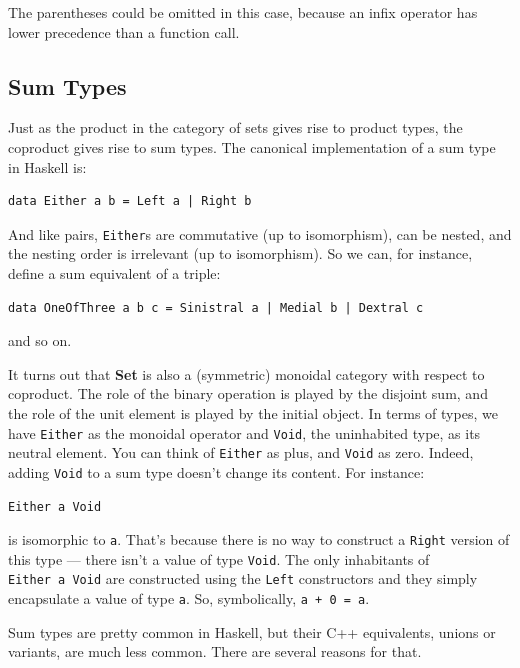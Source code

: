 The parentheses could be omitted in this case, because an infix operator
has lower precedence than a function call.

\subsection{Sum Types}\label{sum-types}

Just as the product in the category of sets gives rise to product types,
the coproduct gives rise to sum types. The canonical implementation of a
sum type in Haskell is:

\begin{verbatim}
data Either a b = Left a | Right b
\end{verbatim}

And like pairs, \texttt{Either}s are commutative (up to isomorphism),
can be nested, and the nesting order is irrelevant (up to isomorphism).
So we can, for instance, define a sum equivalent of a triple:

\begin{verbatim}
data OneOfThree a b c = Sinistral a | Medial b | Dextral c
\end{verbatim}

and so on.

It turns out that \textbf{Set} is also a (symmetric) monoidal category
with respect to coproduct. The role of the binary operation is played by
the disjoint sum, and the role of the unit element is played by the
initial object. In terms of types, we have \texttt{Either} as the
monoidal operator and \texttt{Void}, the uninhabited type, as its
neutral element. You can think of \texttt{Either} as plus, and
\texttt{Void} as zero. Indeed, adding \texttt{Void} to a sum type
doesn't change its content. For instance:

\begin{verbatim}
Either a Void
\end{verbatim}

is isomorphic to \texttt{a}. That's because there is no way to construct
a \texttt{Right} version of this type --- there isn't a value of type
\texttt{Void}. The only inhabitants of \texttt{Either\ a\ Void} are
constructed using the \texttt{Left} constructors and they simply
encapsulate a value of type \texttt{a}. So, symbolically,
\texttt{a\ +\ 0\ =\ a}.

Sum types are pretty common in Haskell, but their C++ equivalents,
unions or variants, are much less common. There are several reasons for
that.

